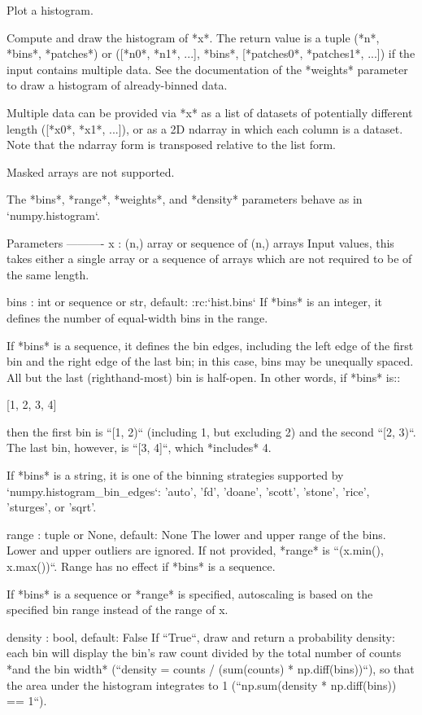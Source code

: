 \begin{DoxyVerb}
\begin{DoxyVerb}Plot a histogram.

Compute and draw the histogram of *x*.  The return value is a tuple
(*n*, *bins*, *patches*) or ([*n0*, *n1*, ...], *bins*, [*patches0*,
*patches1*, ...]) if the input contains multiple data.  See the
documentation of the *weights* parameter to draw a histogram of
already-binned data.

Multiple data can be provided via *x* as a list of datasets
of potentially different length ([*x0*, *x1*, ...]), or as
a 2D ndarray in which each column is a dataset.  Note that
the ndarray form is transposed relative to the list form.

Masked arrays are not supported.

The *bins*, *range*, *weights*, and *density* parameters behave as in
`numpy.histogram`.

Parameters
----------
x : (n,) array or sequence of (n,) arrays
    Input values, this takes either a single array or a sequence of
    arrays which are not required to be of the same length.

bins : int or sequence or str, default: :rc:`hist.bins`
    If *bins* is an integer, it defines the number of equal-width bins
    in the range.

    If *bins* is a sequence, it defines the bin edges, including the
    left edge of the first bin and the right edge of the last bin;
    in this case, bins may be unequally spaced.  All but the last
    (righthand-most) bin is half-open.  In other words, if *bins* is::

[1, 2, 3, 4]

    then the first bin is ``[1, 2)`` (including 1, but excluding 2) and
    the second ``[2, 3)``.  The last bin, however, is ``[3, 4]``, which
    *includes* 4.

    If *bins* is a string, it is one of the binning strategies
    supported by `numpy.histogram_bin_edges`: 'auto', 'fd', 'doane',
    'scott', 'stone', 'rice', 'sturges', or 'sqrt'.

range : tuple or None, default: None
    The lower and upper range of the bins. Lower and upper outliers
    are ignored. If not provided, *range* is ``(x.min(), x.max())``.
    Range has no effect if *bins* is a sequence.

    If *bins* is a sequence or *range* is specified, autoscaling
    is based on the specified bin range instead of the
    range of x.

density : bool, default: False
    If ``True``, draw and return a probability density: each bin
    will display the bin's raw count divided by the total number of
    counts *and the bin width*
    (``density = counts / (sum(counts) * np.diff(bins))``),
    so that the area under the histogram integrates to 1
    (``np.sum(density * np.diff(bins)) == 1``).


\end{DoxyVerb}
\end{DoxyVerb}
